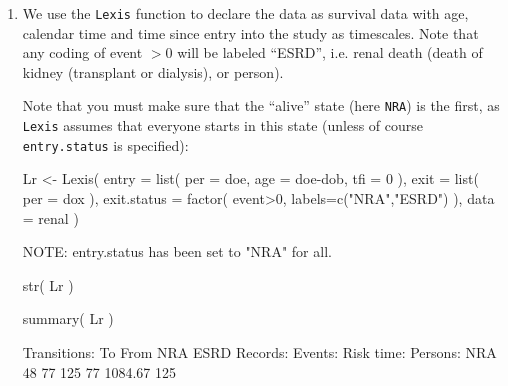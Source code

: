 \begin{enumerate}
\item We use the \texttt{Lexis} function to declare the data as
  survival data with age, calendar time and time since entry into the
  study as timescales. Note that any coding of event $>0$ will be
  labeled ``ESRD'', i.e. renal death (death of kidney (transplant or
  dialysis), or person).

  Note that you must make sure that the ``alive'' state (here
  \texttt{NRA}) is the first, as \texttt{Lexis} assumes that everyone
  starts in this state (unless of course \texttt{entry.status} is
  specified):
\begin{Schunk}
\begin{Sinput}
 Lr <- Lexis( entry = list( per = doe,
                            age = doe-dob,
                            tfi = 0 ),
               exit = list( per = dox ),
        exit.status = factor( event>0, labels=c("NRA","ESRD") ),
               data = renal )
\end{Sinput}
\begin{Soutput}
NOTE: entry.status has been set to "NRA" for all.
\end{Soutput}
\begin{Sinput}
 str( Lr )
\end{Sinput}
\begin{Sinput}
 summary( Lr )
\end{Sinput}
\begin{Soutput}
Transitions:
     To
From  NRA ESRD  Records:  Events: Risk time:  Persons:
  NRA  48   77       125       77    1084.67       125
\end{Soutput}
\end{Schunk}


\end{enumerate}
